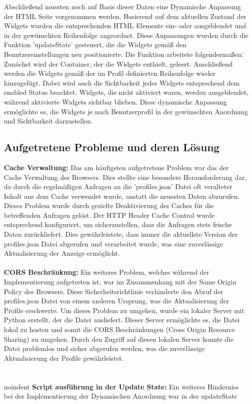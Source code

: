 Abschließend mussten noch auf Basis dieser Daten eine Dynamische Anpassung der HTML Seite vorgenommen werden.  Basierend auf dem aktuellen Zustand der Widgets wurden die entsprechenden HTML Elemente ein- oder ausgeblendet und in der gewünschten Reihenfolge angeordnet. Diese Anpassungen wurden durch die Funktion 'updateState' gesteuert, die die Widgets gemäß den Benutzereinstellungen neu positionierte. Die Funktion arbeitete folgendermaßen: Zunächst wird der Container, der die Widgets enthielt, geleert. Anschließend werden die Widgets gemäß der im Profil definierten Reihenfolge wieder hinzugefügt. Dabei wird auch die Sichtbarkeit jedes Widgets entsprechend dem enabled Status beachtet. Widgets, die nicht aktiviert waren, werden ausgeblendet, während aktivierte Widgets sichtbar blieben. Diese dynamische Anpassung ermöglichte es, die Widgets je nach Benutzerprofil in der gewünschten Anordnung und Sichtbarkeit darzustellen.

\subsection*{Aufgetretene Probleme und deren Lösung}
\textbf{Cache Verwaltung:} Das am häufigsten aufgetretene Problem war das der Cache Verwaltung des Browsers. Dies stellte eine besondere Herausforderung dar, da durch die regelmäßigen Anfragen an die 'profiles.json' Datei oft veralteter Inhalt aus dem Cache verwendet wurde, anstatt die neuesten Daten abzurufen. Dieses Problem wurde durch gezielte Deaktivierung des Caches für die betreffenden Anfragen gelöst. Der HTTP Header Cache Control wurde entsprechend konfiguriert, um sicherzustellen, dass die Anfragen stets frische Daten zurückliefert. Dies gewährleistete, dass immer die aktuellste Version der profiles.json Datei abgerufen und verarbeitet wurde, was eine zuverlässige Aktualisierung der Anzeige ermöglicht. \\ \\
\noindent
\textbf{CORS Beschränkung:} Ein weiteres Problem, welches während der Implementierung aufgetreten ist, war im Zusammenhang mit der Same Origin Policy des Browsers. Diese Sicherheitsrichtlinie verhinderte den Abruf der profiles.json Datei von einem anderen Ursprung, was die Aktualisierung der Profile erschwerte. Um dieses Problem zu umgehen, wurde ein lokaler Server mit Python erstellt, der die Datei ausliefert. Dieser Server ermöglichte es, die Datei lokal zu hosten und somit die CORS Beschränkungen (Cross Origin Resource Sharing) zu umgehen. Durch den Zugriff auf diesen lokalen Server konnte die Datei problemlos und sicher abgerufen werden, was die zuverlässige Aktualisierung der Profile gewährleistet.
\\ \\
\\noindent
\textbf{Script ausführung in der Update State:} Ein weiteres Hinderniss bei der Implementierung der Dynamischen Anordnung war in der updateState

